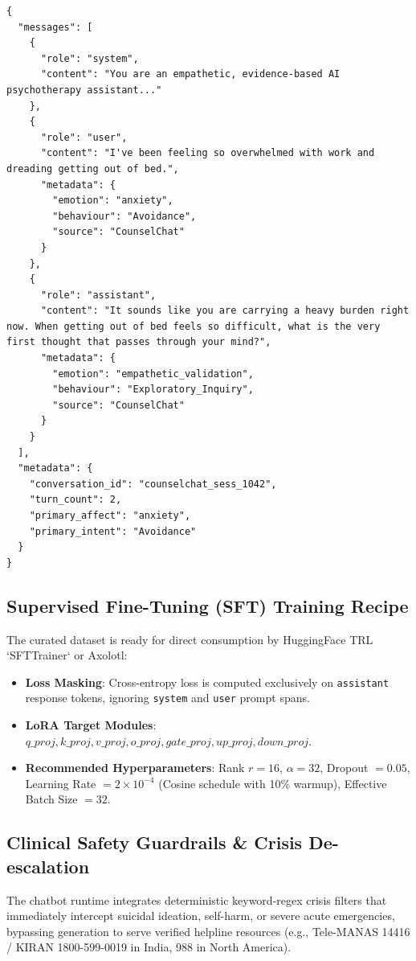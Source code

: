 \documentclass[11pt,a4paper]{article}
\begin{document}
\begin{lstlisting}[style=jsonstyle, caption={Standard ChatML Format with Affective \& Intent Metadata}]
{
  "messages": [
    {
      "role": "system",
      "content": "You are an empathetic, evidence-based AI psychotherapy assistant..."
    },
    {
      "role": "user",
      "content": "I've been feeling so overwhelmed with work and dreading getting out of bed.",
      "metadata": {
        "emotion": "anxiety",
        "behaviour": "Avoidance",
        "source": "CounselChat"
      }
    },
    {
      "role": "assistant",
      "content": "It sounds like you are carrying a heavy burden right now. When getting out of bed feels so difficult, what is the very first thought that passes through your mind?",
      "metadata": {
        "emotion": "empathetic_validation",
        "behaviour": "Exploratory_Inquiry",
        "source": "CounselChat"
      }
    }
  ],
  "metadata": {
    "conversation_id": "counselchat_sess_1042",
    "turn_count": 2,
    "primary_affect": "anxiety",
    "primary_intent": "Avoidance"
  }
}
\end{lstlisting}

\subsection{Supervised Fine-Tuning (SFT) Training Recipe}
The curated dataset is ready for direct consumption by HuggingFace TRL `SFTTrainer` or Axolotl:
\begin{itemize}[leftmargin=*, label=\color{clinicalteal}$\bullet$]
  \item \textbf{Loss Masking}: Cross-entropy loss is computed exclusively on \texttt{assistant} response tokens, ignoring \texttt{system} and \texttt{user} prompt spans.
  \item \textbf{LoRA Target Modules}: $q\_proj, k\_proj, v\_proj, o\_proj, gate\_proj, up\_proj, down\_proj$.
  \item \textbf{Recommended Hyperparameters}: Rank $r = 16$, $\alpha = 32$, Dropout $= 0.05$, Learning Rate $= 2\times 10^{-4}$ (Cosine schedule with 10\% warmup), Effective Batch Size $= 32$.
\end{itemize}

\subsection{Clinical Safety Guardrails \& Crisis De-escalation}
The chatbot runtime integrates deterministic keyword-regex crisis filters that immediately intercept suicidal ideation, self-harm, or severe acute emergencies, bypassing generation to serve verified helpline resources (e.g., Tele-MANAS 14416 / KIRAN 1800-599-0019 in India, 988 in North America).
\end{document}
